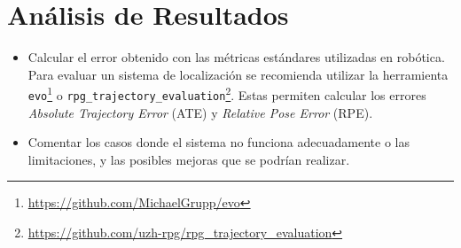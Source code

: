 \documentclass[tp]{lcc}
\begin{document}
	
	\section{Análisis de Resultados}
		\begin{itemize}
			\item Calcular el error obtenido con las métricas estándares utilizadas en robótica. Para evaluar un sistema de localización se recomienda utilizar la herramienta \lstinline{evo}\footnote{\url{https://github.com/MichaelGrupp/evo}} o \lstinline{rpg_trajectory_evaluation}\footnote{\url{https://github.com/uzh-rpg/rpg_trajectory_evaluation}}. Estas permiten calcular los errores \emph{Absolute Trajectory Error} (ATE) y \emph{Relative Pose Error} (RPE).
		
			\item Comentar los casos donde el sistema no funciona adecuadamente o las limitaciones, y las posibles mejoras que se podrían realizar.
		\end{itemize}

	\printbibliography
	
\end{document}
